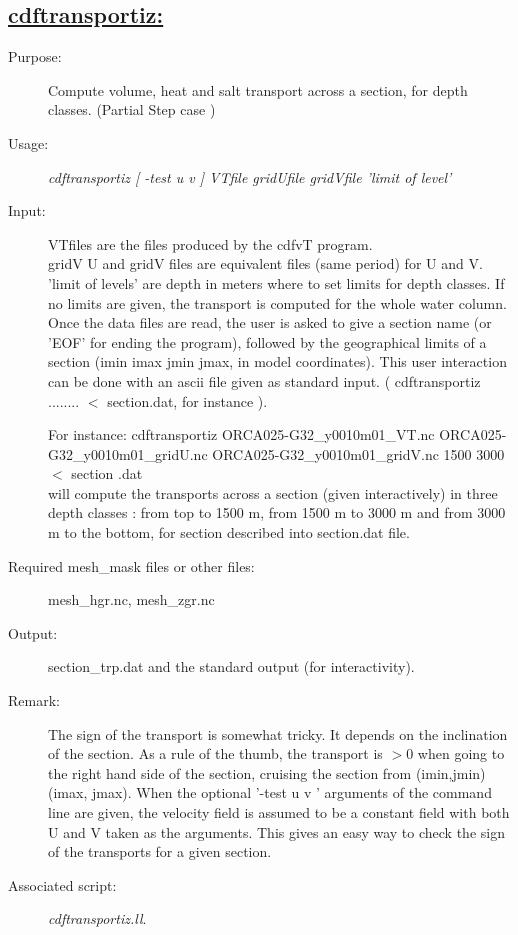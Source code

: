 \documentclass[a4paper,11pt]{article}
\begin{document}
\subsection*{\underline{cdftransportiz:}}
\begin{description}
\item[Purpose:] Compute volume, heat and salt transport across a section, for depth classes. (Partial Step case )
\item[Usage:] {\em cdftransportiz [ -test u v ] VTfile gridUfile gridVfile  'limit of level' }
\item[Input:] VTfiles are the files produced by the cdfvT program. \\
gridV U and gridV files are equivalent files (same period) for U and V. \\
'limit of levels' are depth in meters where to set limits for depth classes. If no limits are given, the transport is
computed for the whole water column. \\
Once the data  files are read, the user is asked to give a section name (or 'EOF' for ending the program), followed
by the geographical limits of a section (imin imax jmin jmax, in model coordinates). This user interaction can be done
with an ascii file given as standard input. ( cdftransportiz ........ $<$ section.dat, for instance ).

For instance: cdftransportiz ORCA025-G32\_y0010m01\_VT.nc ORCA025-G32\_y0010m01\_gridU.nc  ORCA025-G32\_y0010m01\_gridV.nc 
1500 3000 $<$ section .dat \\
will compute the transports across a section (given interactively) in three depth classes : from top to 1500 m, from 1500 m
to 3000 m and from 3000 m to the bottom, for section described into section.dat file.
\item[Required mesh\_mask files or other files:]   mesh\_hgr.nc, mesh\_zgr.nc
\item[Output:]section\_trp.dat and the standard output (for interactivity).
\item[Remark:] The sign of the transport is somewhat tricky. It depends on the inclination of the section. As a rule of 
the thumb, the transport is $>0$ when going to the right hand side of the section, cruising the section from (imin,jmin) 
(imax, jmax). When the optional '-test u v ' arguments of the command line are  given, the velocity field is assumed to 
be a constant field with both U and V taken as the arguments. This gives an easy way to check the sign of the transports for a given section.

\item[Associated script:] {\em cdftransportiz.ll}. 
\end{description}
\end{document}

